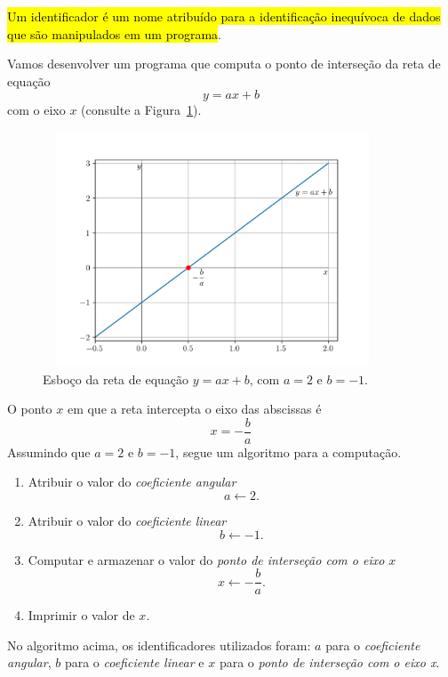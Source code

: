 \hl{Um identificador é um nome atribuído para a identificação inequívoca de dados que são manipulados em um programa}.

\begin{ex}\label{cap_lingua_sec_dados:ex:reta}
  Vamos desenvolver um programa que computa o ponto de interseção da reta de equação
  \begin{equation}
    y = ax + b
  \end{equation}
  com o eixo $x$ (consulte a Figura~\ref{cap_lingua_sec_dados:fig:ex_reta}).

  \begin{figure}[H]
    \centering
    \includegraphics[max width=0.9\textwidth, height=2.75in]{./cap_lingua/dados/fig_ex_reta/fig.png}
    \caption{Esboço da reta de equação $y = ax + b$, com $a=2$ e $b=-1$.}
    \label{cap_lingua_sec_dados:fig:ex_reta}
  \end{figure}

  O ponto $x$ em que a reta intercepta o eixo das abscissas é
  \begin{equation}
    x = -\frac{b}{a}
  \end{equation}
  Assumindo que $a=2$ e $b=-1$, segue um algoritmo para a computação.
  \begin{enumerate}
  \item Atribuir o valor do \emph{coeficiente angular}
    \begin{equation}
      a\leftarrow 2.
    \end{equation}
  \item Atribuir o valor do \emph{coeficiente linear}
    \begin{equation}
      b\leftarrow -1.
    \end{equation}
  \item Computar e armazenar o valor do \emph{ponto de interseção com o eixo $x$}
    \begin{equation}
      x \leftarrow -\frac{b}{a}.
    \end{equation}
  \item Imprimir o valor de $x$.
  \end{enumerate}

  No algoritmo acima, os identificadores utilizados foram: $a$ para o \emph{coeficiente angular}, $b$ para o \emph{coeficiente linear} e $x$ para o \emph{ponto de interseção com o eixo x}.
\end{ex}


